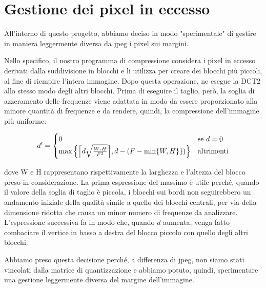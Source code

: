 \section{Gestione dei pixel in eccesso}\label{sec:border}

All'interno di questo progetto, abbiamo deciso in modo "sperimentale" di gestire in maniera leggermente diversa da jpeg i pixel sui margini.

Nello specifico, il nostro programma di compressione considera i pixel in eccesso derivati dalla suddivisione in blocchi e li utilizza per creare dei blocchi più piccoli, al fine di riempire l'intera immagine. Dopo questa operazione, ne esegue la DCT2 allo stesso modo degli altri blocchi. Prima di eseguire il taglio, però, la soglia di azzeramento delle frequenze viene adattata in modo da essere proporzionato alla minore quantità di frequenze e da rendere, quindi, la compressione dell'immagine più uniforme:

\begin{equation}
d' = \begin{cases}
	0 &\text{se $d=0$}\\
	\max \left\{  \ceil*{d  \sqrt{ \frac{W \cdot H}{F^{2}}}}, d - (F - \min \{W , H \}\})   \right \} &\text{altrimenti}
 \end{cases}
 \label{eq:d}
\end{equation}

dove W e H rappresentano rispettivamente la larghezza e l'altezza del blocco preso in considerazione.
La prima espressione del massimo è utile perché, quando il valore della soglia di taglio è piccola, i blocchi sui bordi  non seguirebbero un andamento iniziale della qualità simile a quello dei blocchi centrali, per via della dimensione ridotta che causa un minor numero di frequenze da analizzare. L'espressione successiva fa in modo che, quando $d$ aumenta, venga fatto combaciare il vertice in basso a destra del blocco piccolo con quello degli altri blocchi.

Abbiamo preso questa decisione perché, a differenza di jpeg, non siamo stati vincolati dalla matrice di quantizzazione e abbiamo potuto, quindi, sperimentare una gestione leggermente diversa del margine dell'immagine.


